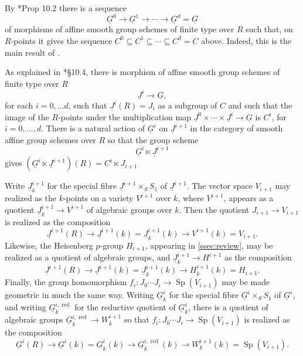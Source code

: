 \documentclass[10pt]{amsart}
\makeatletter
\theoremstyle{plain}
\theoremstyle{definition}
\newcommand{\Fq}{k}
\newcommand{\labitem}[2]{
\def\@itemlabel{\textbf{#1}}
\item
\def\@currentlabel{#1}\label{#2}}
\newcommand{\Sp}{{\operatorname{Sp}}}
\makeatother
\begin{document}
By \cite{yu:03a}*{Prop 10.2} there is a sequence  
\[
\underline{G}^0 \to \underline{G}^1 \to \cdots \to \underline{G}^d = \underline{G}
\]
of morphisms of affine smooth group schemes of finite type over $R$ such that, on $R$-points it gives the sequence $C^0 \subseteq C^1 \subseteq \cdots \subseteq C^d= C$ above.
Indeed, this is the main result of \cite{yu:03a}.

As explained in \cite{yu:03a}*{\S 10.4}, there is morphism of affine smooth group schemes of finite type over $R$ 
\[
\underline{J}^i \to \underline{G},
\] 
for each $i=0,\ldots d$, such that $\underline{J}^i(R) = J_i$ as a subgroup of $C$ and such that the image of the $R$-points under the multiplication map $\underline{J}^0 \times \cdots \times \underline{J}^i \to \underline{G}$ is $C^i$, for $i=0, \ldots , d$.
There is a natural action of $\underline{G}^i$ on $\underline{J}^{i+1}$ in the category of smooth affine group schemes over $R$ so that the group scheme
\[
\underline{G}^i \ltimes \underline{J}^{i+1}
\]
gives $(\underline{G}^i \ltimes \underline{J}^{i+1})(R) = C^i \ltimes J_{i+1}$

\newcommand{\reductive}{{\operatorname{red}}}

Write $\underline{J}^{i+1}_\Fq$ for the special fibre $\underline{J}^{i+1}\times_S S_1$ of $\underline{J}^{i+1}$. 
The vector space $V_{i+1}$ may realized as the $\Fq$-points on a variety $V^{i+1}$ over $\Fq$, where $V^{i+1}$, appears as a quotient $\underline{J}^{i+1}_{\Fq} \to V^{i+1}$ of algebraic groups over $\Fq$. Then the quotient $J_{i+1} \to V_{i+1}$ is realized as the composition
\[
\underline{J}^{i+1}(R) \to \underline{J}^{i+1}(\Fq) = \underline{J}^{i+1}_\Fq(\Fq) \to V^{i+1}(\Fq) = V_{i+1}.
\]
Likewise, the Heisenberg $p$-group $H_{i+1}$, appearing in \ref{ssec:review}, may be realized as a quotient of algebraic groups, and $\underline{J}^{i+1}_{\Fq} \to H^{i+1}$ as the composition 
\[
\underline{J}^{i+1}(R) \to \underline{J}^{i+1}(\Fq) = \underline{J}^{i+1}_\Fq(\Fq) \to H^{i+1}_{\Fq}(\Fq) = H_{i+1}.
\]
Finally, the group homomorphism $f_i : J_0\cdots J_i \to \Sp(V_{i+1})$ may be made geometric in much the same way. 
Writing $\underline{G}^{i}_\Fq$ for the special fibre $\underline{G}^{i}\times_S S_1$ of $\underline{G}^{i}$, and writing $\underline{G}^{i,\reductive}_\Fq$ for the reductive quotient of $\underline{G}^{i}_\Fq$, there is a quotient of algebraic groups $\underline{G}^{i,\reductive}_\Fq \to W^{i+1}_\Fq$ so that $f_i : J_0\cdots J_i \to \Sp(V_{i+1})$ is realized as the composition
\[
\underline{G}^{i}(R) \to \underline{G}^{i}(\Fq) = \underline{G}^{i}_\Fq(\Fq) \to  \underline{G}^{i,\reductive}_\Fq(\Fq) \to W^{i+1}_{\Fq}(\Fq) = \Sp(V_{i+1}).
\]
\end{document}
